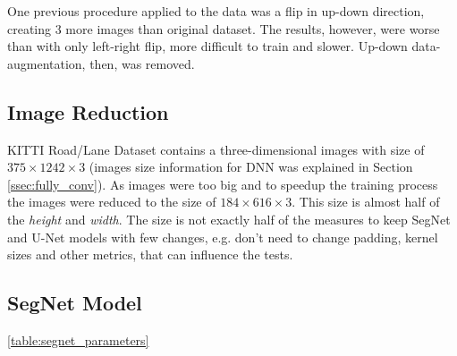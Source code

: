 \documentclass[10pt,twocolumn,letterpaper]{article}
\begin{document}
One previous procedure applied to the data was a flip in up-down direction, creating 3 more images than original dataset. The results, however, were worse than with only left-right flip, more difficult to train and slower. Up-down data-augmentation, then, was removed.

\subsection{Image Reduction} \label{ssec:image_reduction}

KITTI Road/Lane Dataset contains a three-dimensional images with size of $375 \times 1242 \times 3$ (images size information for DNN was explained in Section \ref{ssec:fully_conv}). As images were too big and to speedup the training process the images were reduced to the size of $ 184 \times 616 \times 3$. This size is almost half of the \textit{height} and \textit{width}. The size is not exactly half of the measures to keep SegNet and U-Net models with few changes, e.g. don't need to change padding, kernel sizes and other metrics, that can influence the tests.

\subsection{SegNet Model} \label{ssec:segnet_model}

\ref{table:segnet_parameters}
\end{document}
